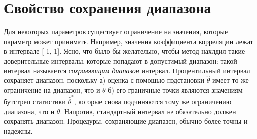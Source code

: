 \section{Свойство сохранения диапазона}
Для некоторых параметров существует ограничение на значения, которые параметр может принимать. Например, значения коэффициента корреляции лежат в интервале [-1, 1]. Ясно, что было бы желательно, чтобы метод нахлдил такие доверительные интервалы, которые попадают в допустимый диапазон: такой интервал называется \textit{сохраняющим диапазон} интервал. Процентильный интервал сохраняет диапазон, поскольку а) оценка с помощью подстановки $\widehat{\theta}$ имеет то же ограничение на диапазон, что и $\theta$ б) его граничные точки являются значениям бутстреп статистики $\widehat{\theta}^{*}$, которые снова подчиняются тому же ограничению диапазона, что и $\theta$. Напротив, стандартный интервал не обязательно должен сохранять диапазон. Процедуры, сохраняющие диапазон, обычно более точны и надежны.

